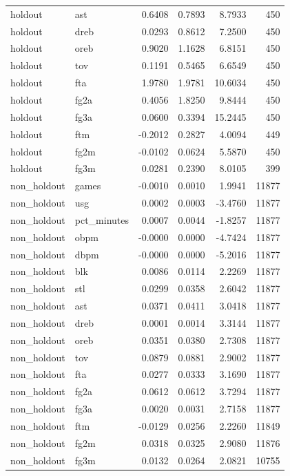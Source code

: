 \begin{table}
\begin{tabular}{llrrrr}
holdout & ast & 0.6408 & 0.7893 & 8.7933 & 450 \\
holdout & dreb & 0.0293 & 0.8612 & 7.2500 & 450 \\
holdout & oreb & 0.9020 & 1.1628 & 6.8151 & 450 \\
holdout & tov & 0.1191 & 0.5465 & 6.6549 & 450 \\
holdout & fta & 1.9780 & 1.9781 & 10.6034 & 450 \\
holdout & fg2a & 0.4056 & 1.8250 & 9.8444 & 450 \\
holdout & fg3a & 0.0600 & 0.3394 & 15.2445 & 450 \\
holdout & ftm & -0.2012 & 0.2827 & 4.0094 & 449 \\
holdout & fg2m & -0.0102 & 0.0624 & 5.5870 & 450 \\
holdout & fg3m & 0.0281 & 0.2390 & 8.0105 & 399 \\
non\_holdout & games & -0.0010 & 0.0010 & 1.9941 & 11877 \\
non\_holdout & usg & 0.0002 & 0.0003 & -3.4760 & 11877 \\
non\_holdout & pct\_minutes & 0.0007 & 0.0044 & -1.8257 & 11877 \\
non\_holdout & obpm & -0.0000 & 0.0000 & -4.7424 & 11877 \\
non\_holdout & dbpm & -0.0000 & 0.0000 & -5.2016 & 11877 \\
non\_holdout & blk & 0.0086 & 0.0114 & 2.2269 & 11877 \\
non\_holdout & stl & 0.0299 & 0.0358 & 2.6042 & 11877 \\
non\_holdout & ast & 0.0371 & 0.0411 & 3.0418 & 11877 \\
non\_holdout & dreb & 0.0001 & 0.0014 & 3.3144 & 11877 \\
non\_holdout & oreb & 0.0351 & 0.0380 & 2.7308 & 11877 \\
non\_holdout & tov & 0.0879 & 0.0881 & 2.9002 & 11877 \\
non\_holdout & fta & 0.0277 & 0.0333 & 3.1690 & 11877 \\
non\_holdout & fg2a & 0.0612 & 0.0612 & 3.7294 & 11877 \\
non\_holdout & fg3a & 0.0020 & 0.0031 & 2.7158 & 11877 \\
non\_holdout & ftm & -0.0129 & 0.0256 & 2.2260 & 11849 \\
non\_holdout & fg2m & 0.0318 & 0.0325 & 2.9080 & 11876 \\
non\_holdout & fg3m & 0.0132 & 0.0264 & 2.0821 & 10755 \\
\bottomrule
\end{tabular}
\end{table}
